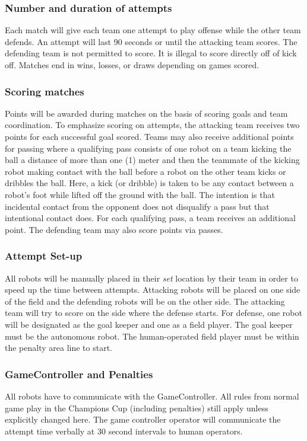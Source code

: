 \subsubsection{Number and duration of attempts}
Each match will give each team one attempt to play offense while the other team defends. An attempt will last 90 seconds or until the attacking team scores. The defending team is not permitted to score. It is illegal to score directly off of kick off. Matches end in wins, losses, or draws depending on games scored.

\subsubsection{Scoring matches}
Points will be awarded during matches on the basis of scoring goals and team coordination. To emphasize scoring on attempts, the attacking team receives two points for each successful goal scored. Teams may also receive additional points for passing where a qualifying pass consists of one robot on a team kicking the ball a distance of more than one (1) meter and then the teammate of the kicking robot making contact with the ball before a robot on the other team kicks or dribbles the ball. Here, a kick (or dribble) is taken to be any contact between a robot's foot while lifted off the ground with the ball. The intention is that  incidental contact from the opponent does not disqualify a pass but that intentional contact does. For each qualifying pass, a team receives an additional point. The defending team may also score points via passes.

\subsubsection{Attempt Set-up}
All robots will be manually placed in their \textit{set} location by their team in order to speed up the time between attempts.  Attacking robots will be placed on one side of the field and the defending robots will be on the other side. The attacking team will try to score on the side where the defense starts. For defense, one robot will be designated as the goal keeper and one as a field player. The goal keeper must be the autonomous robot. The human-operated field player must be within the penalty area line to start.


\subsubsection{GameController and Penalties}
All robots have to communicate with the GameController. All rules from normal game play in the Champions Cup (including penalties) still apply unless explicitly changed here. The game controller operator will communicate the attempt time verbally at 30 second intervals to human operators.


